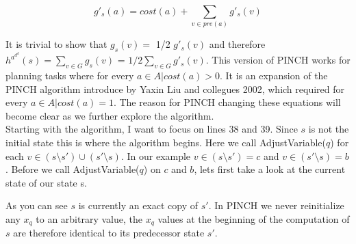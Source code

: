\begin{equation}
    g'_s(a) = cost(a) + \sum_{v \in pre(a)}^{} g'_s(v)
\end{equation}

It is trivial to show that $g_s(v) =$ 1/2 $g'_s(v)$ and therefore $h^a^d^d(s) = \sum_{v \in G}^{} g_s(v)$ = $1/2 \sum_{v \in G}^{} g'_s(v)$. This version of PINCH works for planning tasks where for every $a \in A | cost(a) > 0$. It is an expansion of the PINCH algorithm introduce by Yaxin Liu and collegues 2002, which required for every $a \in A | cost(a) = 1$. The reason for PINCH changing these equations will become clear as we further explore the algorithm. \\

Starting with the algorithm, I want to focus on lines 38 and 39. Since $s$ is not the initial state this is where the algorithm begins. Here we call AdjustVariable($q$) for each $v \in (s \setminus s') \cup (s' \setminus s)$. In our example $ v \in (s \setminus s') = c$ and $v \in (s' \setminus s) = b$. Before we call AdjustVariable($q$) on $c$ and $b$, lets first take a look at the current state of our state s.

As you can see $s$ is currently an exact copy of $s'$. In PINCH we never reinitialize any $x_q$ to an arbitrary value, the $x_q$ values at the beginning of the computation of $s$ are therefore identical to its predecessor state $s'$. \\

